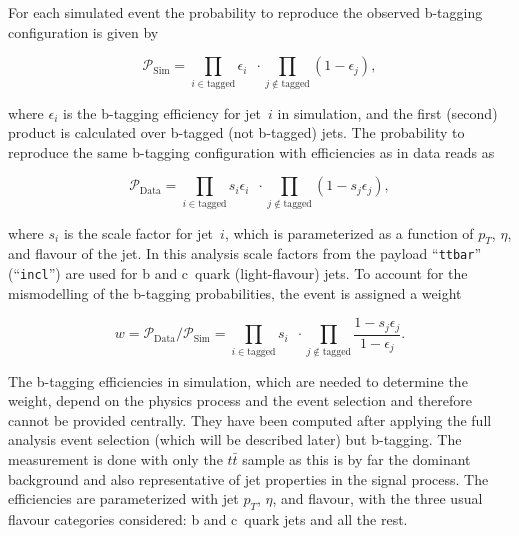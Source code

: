 For each simulated event the probability to reproduce the observed b-tagging configuration is given by
\begin{linenomath}
\begin{equation}
\mathcal P_\text{Sim} = \prod_{i\in\text{tagged}} \epsilon_i \enspace \cdot \prod_{j\notin\text{tagged}} (1 - \epsilon_j),
\end{equation}
\end{linenomath}
where $\epsilon_i$ is the b-tagging efficiency for jet~$i$ in simulation, and the first (second) product is calculated over b-tagged (not b-tagged) jets.
The probability to reproduce the same b-tagging configuration with efficiencies as in data reads as
\begin{linenomath}
\begin{equation}
\mathcal P_\text{Data} = \prod_{i\in\text{tagged}} s_i\epsilon_i \enspace \cdot \prod_{j\notin\text{tagged}} (1 - s_j\epsilon_j),
\end{equation}
\end{linenomath}
where $s_i$ is the scale factor for jet~$i$, which is parameterized as a function of $p_{T}$, $\eta$, and flavour of the jet.
In this analysis scale factors from the payload ``\texttt{ttbar}'' (``\texttt{incl}'') are used for b and c~quark (light-flavour) jets.
To account for the mismodelling of the b-tagging probabilities, the event is assigned a weight
\begin{linenomath}
\begin{equation}
\label{Eq:WeightBTag}
w = \mathcal P_\text{Data} / \mathcal P_\text{Sim} = \prod_{i\in\text{tagged}} s_i \enspace \cdot \prod_{j\notin\text{tagged}} \frac{1 - s_j\epsilon_j}{1 - \epsilon_j}.
\end{equation}
\end{linenomath}

The b-tagging efficiencies in simulation, which are needed to determine the weight, depend on the physics process and the event selection and therefore cannot be provided centrally.
They have been computed after applying the full analysis event selection (which will be described later) but b-tagging.
The measurement is done with only the $t\bar t$ sample as this is by far the dominant background and also representative of jet properties in the signal process.
The efficiencies are parameterized with jet $p_{T}$, $\eta$, and flavour, with the three usual flavour categories considered: b and c~quark jets and all the rest.

